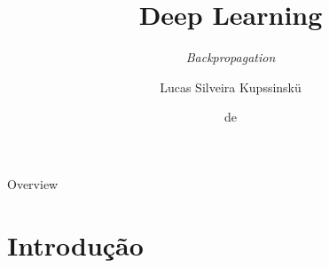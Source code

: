 \documentclass[aspectratio=169, xcolor=dvipsnames]{beamer}
\title{Deep Learning}
\subtitle{\textit{Backpropagation}}
\author{Lucas Silveira Kupssinskü}
\institute
{ Machine Learning Theory and Applications Laboratory \\ PUCRS %
}
\date{\mespor de \the\year}
\begin{document}
  \begin{frame}
    \titlepage
  \end{frame}

  \begin{frame}{Overview}
    \tableofcontents
  \end{frame}
  \section{Introdução}
\end{document}
